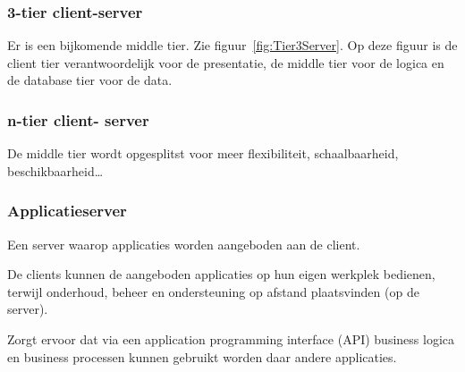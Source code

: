 \documentclass[a4paper,12pt]{article}
\begin{document}
\subsubsection{3-tier client-server}
Er is een bijkomende middle tier.
Zie figuur~\ref{fig:Tier3Server}.
Op deze figuur is de client tier verantwoordelijk voor de presentatie, de middle tier voor de logica en de database tier voor de data.

\subsubsection{n-tier client- server}
De middle tier wordt opgesplitst voor meer flexibiliteit, schaalbaarheid, beschikbaarheid\dots

\subsubsection{Applicatieserver}
Een server waarop applicaties worden aangeboden aan de client.

De clients kunnen de aangeboden applicaties op hun eigen werkplek bedienen, terwijl onderhoud, beheer en ondersteuning op afstand plaatsvinden (op de server).

Zorgt ervoor dat via een application programming interface (API) business logica en business processen kunnen gebruikt worden daar andere applicaties.
\end{document}
